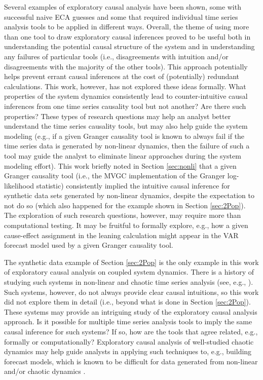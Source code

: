 \documentclass{article}[10pt]
\begin{document}
Several examples of exploratory causal analysis have been shown, some with successful naive ECA guesses and some that required individual time series analysis tools to be applied in different ways.  Overall, the theme of using more than one tool to draw exploratory causal inferences proved to be useful both in understanding the potential causal structure of the system and in understanding any failures of particular tools (i.e., disagreements with intuition and/or disagreements with the majority of the other tools).  This approach potentially helps prevent errant causal inferences at the cost of (potentially) redundant calculations.  This work, however, has not explored these ideas formally.  What properties of the system dynamics consistently lead to counter-intuitive causal inferences from one time series causality tool but not another?  Are there such properties?  These types of research questions may help an analyst better understand the time series causality tools, but may also help guide the system modeling (e.g., if a given Granger causality tool is known to always fail if the time series data is generated by non-linear dynamics, then the failure of such a tool may guide the analyst to eliminate linear approaches during the system modeling effort).  This work briefly noted in Section \ref{sec:nonli} that a given Granger causality tool (i.e., the MVGC implementation of the Granger log-likelihood statistic) consistently implied the intuitive causal inference for synthetic data sets generated by non-linear dynamics, despite the expectation to not do so (which also happened for the example shown in Section \ref{sec:2Pop}).  The exploration of such research questions, however, may require more than computational testing.  It may be fruitful to formally explore, e.g., how a given cause-effect assignment in the leaning calculation might appear in the VAR forecast model used by a given Granger causality tool.

The synthetic data example of Section \ref{sec:2Pop} is the only example in this work of exploratory causal analysis on coupled system dynamics.  There is a history of studying such systems in non-linear and chaotic time series analysis (see, e.g., \cite{ITbook_placeholder}).  Such systems, however, do not always provide clear causal intuitions, so this work did not explore them in detail (i.e., beyond what is done in Section \ref{sec:2Pop}).  These systems may provide an intriguing study of the exploratory causal analysis approach.  Is it possible for multiple time series analysis tools to imply the same causal inference for such systems?  If so, how are the tools that agree related, e.g., formally or computationally?  Exploratory causal analysis of well-studied chaotic dynamics may help guide analysts in applying such techniques to, e.g., building forecast models, which is known to be difficult for data generated from non-linear and/or chaotic dynamics \cite{Tong1993}.
\end{document}
